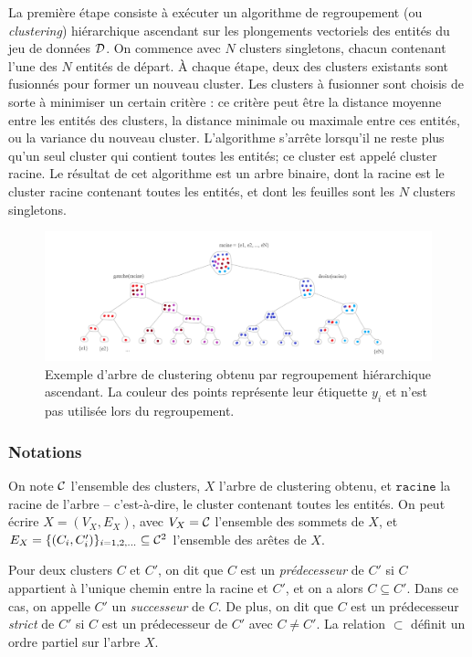 La première étape consiste à exécuter un algorithme de regroupement (ou \textit{clustering}) hiérarchique ascendant sur les plongements vectoriels des entités du jeu de données $\cal{D}$. %
On commence avec $N$ clusters singletons, chacun contenant l'une des $N$ entités de départ. À chaque étape, deux des clusters existants sont fusionnés pour former un nouveau cluster. Les clusters à fusionner sont choisis de sorte à minimiser un certain critère : ce critère peut être la distance moyenne entre les entités des clusters, la distance minimale ou maximale entre ces entités, ou la variance du nouveau cluster. 
L'algorithme s'arrête lorsqu'il ne reste plus qu'un seul cluster qui contient toutes les entités; ce cluster est appelé cluster racine. Le résultat de cet algorithme est un arbre binaire, dont la racine est le cluster racine contenant toutes les entités, et dont les feuilles sont les $N$ clusters singletons.

\begin{figure}[h]
    \centering
    \includegraphics[width=\textwidth]{img/clustering_tree.png}
    \caption[Principe du regroupement hiérarchique ascendant]{Exemple d'arbre de clustering obtenu par regroupement hiérarchique ascendant. La couleur des points représente leur étiquette $y_i$ et n'est pas utilisée lors du regroupement.}
    \label{fig:clustering_tree}
\end{figure}

\subsubsection{Notations}

On note $\Clusters$ l'ensemble des clusters, $X$ l'arbre de clustering obtenu, et $\texttt{racine}$ la racine de l'arbre – c'est-à-dire, le cluster contenant toutes les entités. On peut écrire $X = (V_X, E_X)$, avec $V_X = \Clusters$ l'ensemble des sommets de $X$, et $E_X = \{(C_i, C_i')\}_{i = 1, 2, \ldots } \subseteq \Clusters^2$ l'ensemble des arêtes de $X$.

Pour deux clusters $C$ et $C'$, on dit que $C$ est un \textit{prédecesseur} de $C'$ si $C$ appartient à l'unique chemin entre la racine et $C'$, et on a alors $C \subseteq C'$. Dans ce cas, on appelle $C'$ un \textit{successeur} de $C$. De plus, on dit que $C$ est un prédecesseur \textit{strict} de $C'$ si $C$ est un prédecesseur de $C'$ avec $C \neq C'$. La relation $\subset$ définit un ordre partiel sur l'arbre $X$.

